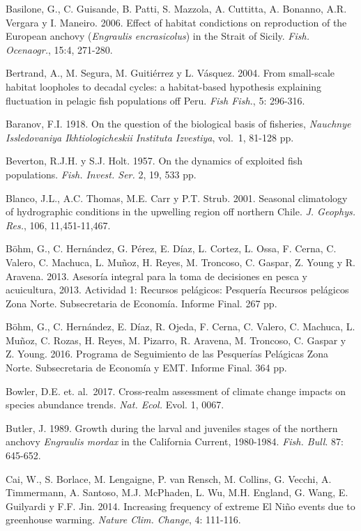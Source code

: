 \documentclass[letter,11pt]{article}
\begin{document}
Basilone, G., C. Guisande, B. Patti, S. Mazzola, A. Cuttitta, A.
Bonanno, A.R. Vergara y I. Maneiro. 2006. Effect of habitat condictions
on reproduction of the European anchovy
(\textit{Engraulis encrasicolus}) in the Strait of Sicily.
\textit{Fish. Ocenaogr.}, 15:4, 271-280.

Bertrand, A., M. Segura, M. Guiti\'errez y L. V\'asquez. 2004. From
small-scale habitat loopholes to decadal cycles: a habitat-based
hypothesis explaining fluctuation in pelagic fish populations off Peru.
\textit{Fish Fish.}, 5: 296-316.

Baranov, F.I. 1918. On the question of the biological basis of
fisheries,
\textit{Nauchnye Issledovaniya Ikhtiologicheskii Instituta Izvestiya},
vol.~1, 81-128 pp.

Beverton, R.J.H. y S.J. Holt. 1957. On the dynamics of exploited fish
populations. \textit{Fish. Invest. Ser.} 2, 19, 533 pp.

Blanco, J.L., A.C. Thomas, M.E. Carr y P.T. Strub. 2001. Seasonal
climatology of hydrographic conditions in the upwelling region off
northern Chile. \textit{J. Geophys. Res.}, 106, 11,451-11,467.

B\"ohm, G., C. Hern\'andez, G. P\'erez, E. D\'iaz, L. Cortez, L. Ossa, F. Cerna,
C. Valero, C. Machuca, L. Mu\~{n}oz, H. Reyes, M. Troncoso, C. Gaspar, Z.
Young y R. Aravena. 2013. Asesor\'ia integral para la toma de decisiones
en pesca y acuicultura, 2013. Actividad 1: Recursos pel\'agicos: Pesquer\'ia
Recursos pel\'agicos Zona Norte. Subsecretaria de Econom\'ia. Informe Final.
267 pp.

B\"ohm, G., C. Hern\'andez, E. D\'iaz, R. Ojeda, F. Cerna, C. Valero, C.
Machuca, L. Mu\~{n}oz, C. Rozas, H. Reyes, M. Pizarro, R. Aravena, M.
Troncoso, C. Gaspar y Z. Young. 2016. Programa de Seguimiento de las
Pesquer\'ias Pel\'agicas Zona Norte. Subsecretaria de Econom\'ia y EMT.
Informe Final. 364 pp.

Bowler, D.E. et. al.~2017. Cross-realm assessment of climate change
impacts on species abundance trends. \textit{Nat. Ecol.} Evol. 1, 0067.

Butler, J. 1989. Growth during the larval and juveniles stages of the
northern anchovy \textit{Engraulis mordax} in the California Current,
1980-1984. \textit{Fish. Bull}. 87: 645-652.

Cai, W., S. Borlace, M. Lengaigne, P. van Rensch, M. Collins, G. Vecchi,
A. Timmermann, A. Santoso, M.J. McPhaden, L. Wu, M.H. England, G. Wang,
E. Guilyardi y F.F. Jin. 2014. Increasing frequency of extreme El Ni\~{n}o
events due to greenhouse warming. \textit{Nature Clim. Change}, 4:
111-116.
\end{document}
